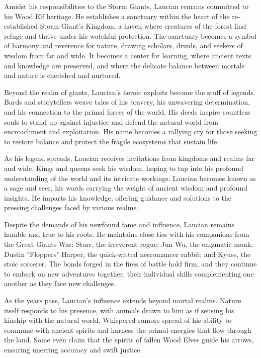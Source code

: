 \documentclass[letterpaper,openany,oneside,twocolumn]{book}
\begin{document}
Amidst his responsibilities to the Storm Giants, Laucian remains committed to his Wood Elf heritage. He establishes a sanctuary within the heart of the re-established Storm Giant's Kingdom, a haven where creatures of the forest find refuge and thrive under his watchful protection. The sanctuary becomes a symbol of harmony and reverence for nature, drawing scholars, druids, and seekers of wisdom from far and wide. It becomes a center for learning, where ancient texts and knowledge are preserved, and where the delicate balance between mortals and nature is cherished and nurtured.

Beyond the realm of giants, Laucian's heroic exploits become the stuff of legends. Bards and storytellers weave tales of his bravery, his unwavering determination, and his connection to the primal forces of the world. His deeds inspire countless souls to stand up against injustice and defend the natural world from encroachment and exploitation. His name becomes a rallying cry for those seeking to restore balance and protect the fragile ecosystems that sustain life.

As his legend spreads, Laucian receives invitations from kingdoms and realms far and wide. Kings and queens seek his wisdom, hoping to tap into his profound understanding of the world and its intricate workings. Laucian becomes known as a sage and seer, his words carrying the weight of ancient wisdom and profound insights. He imparts his knowledge, offering guidance and solutions to the pressing challenges faced by various realms.

Despite the demands of his newfound fame and influence, Laucian remains humble and true to his roots. He maintains close ties with his companions from the Great Giants War: Storr, the irreverent rogue; Jun Wu, the enigmatic monk; Dustin "Floppers" Harper, the quick-witted necromancer rabbit; and Kyuss, the stoic sorcerer. The bonds forged in the fires of battle hold firm, and they continue to embark on new adventures together, their individual skills complementing one another as they face new challenges.

As the years pass, Laucian's influence extends beyond mortal realms. Nature itself responds to his presence, with animals drawn to him as if sensing his kinship with the natural world. Whispered rumors spread of his ability to commune with ancient spirits and harness the primal energies that flow through the land. Some even claim that the spirits of fallen Wood Elves guide his arrows, ensuring unerring accuracy and swift justice.
\end{document}
